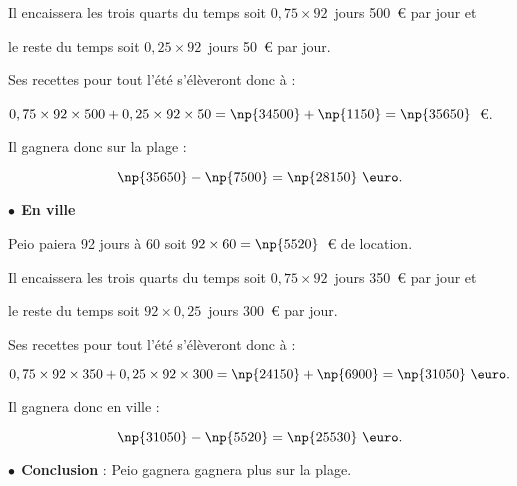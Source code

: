 Il encaissera les trois quarts du temps soit $0,75 \times 92$~jours 500~\euro{} par jour et 

le reste du temps soit $0,25 \times 92$~jours 50~\euro{} par jour.

Ses recettes pour tout l'été s'élèveront donc à :

\begin{center}$0,75 \times 92 \times 500 + 0,25 \times 92 \times 50 = \np{34500} + \np{1150} = \np{35650}$~\euro.\end{center}

Il gagnera donc sur la plage :

\[\np{35650} - \np{7500} = \np{28150}~\text{\euro}.\]

$\bullet~~$\textbf{En ville}

Peio paiera 92 jours  à 60 soit $92 \times 60   = \np{5520}$~\euro{} de location.

Il encaissera les trois quarts du temps soit $0,75 \times 92$~jours 350~\euro{} par jour et 

le reste du temps soit $92 \times 0,25$~jours 300~\euro{} par jour.

Ses recettes pour tout l'été s'élèveront donc à :

\[0,75 \times 92 \times 350 + 0,25 \times 92 \times 300 = \np{24150} + \np{6900} = \np{31050}~\text{\euro}.\]

Il gagnera donc en ville :

\[ \np{31050} - \np{5520} = \np{25530}~\text{\euro}.\]

$\bullet~~$\textbf{Conclusion} : Peio gagnera gagnera plus sur la plage.
 

